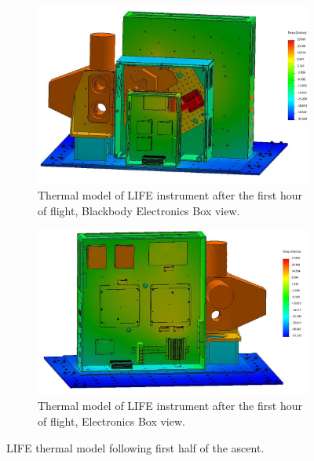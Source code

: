\begin{figure}
    \centering
    \begin{subfigure}[h]{0.9\textwidth}
        \centering
        \includegraphics[width=\textwidth]{chap4_images/ascent_images/ascent_pt1/Test_30_BBEbox.JPG}
        \caption{Thermal model of LIFE instrument after the first hour of flight, Blackbody Electronics Box view.}
        \label{fig:ascent_pt1_model_bbebox}
    \end{subfigure}
    \begin{subfigure}[h]{0.9\textwidth}
        \centering
        \includegraphics[width=\textwidth]{chap4_images/ascent_images/ascent_pt1/Test_30_Ebox.JPG}
        \caption{Thermal model of LIFE instrument after the first hour of flight, Electronics Box view.}
        \label{fig:ascent_pt1_model_ebox}
    \end{subfigure}
    \caption{LIFE thermal model following first half of the ascent.}
    \label{ascent_pt1_model}
\end{figure}

